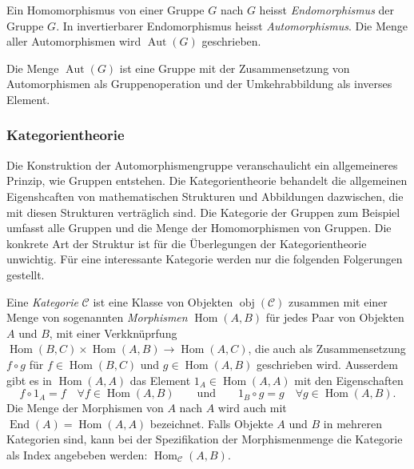\begin{definition}
Ein Homomorphismus von einer Gruppe $G$ nach $G$ heisst {\em Endomorphismus}
der Gruppe $G$.
In invertierbarer Endomorphismus heisst {\em Automorphismus}.
Die Menge aller Automorphismen wird 
$\operatorname{Aut}(G)$ geschrieben.
\end{definition}

\begin{satz}
Die Menge $\operatorname{Aut}(G)$ ist eine Gruppe mit der Zusammensetzung
von Automorphismen als Gruppenoperation und der Umkehrabbildung als
inverses Element.
\end{satz}

%
%
\subsubsection{Kategorientheorie}
Die Konstruktion der Automorphismengruppe veranschaulicht ein allgemeineres
Prinzip, wie Gruppen entstehen.
Die Kategorientheorie behandelt die allgemeinen Eigenshcaften von
mathematischen Strukturen und Abbildungen dazwischen, die mit diesen
Strukturen verträglich sind.
Die Kategorie der Gruppen zum Beispiel umfasst alle Gruppen und die
Menge der Homomorphismen von Gruppen.
Die konkrete Art der Struktur ist für die Überlegungen der Kategorientheorie
unwichtig.
Für eine interessante Kategorie werden nur die folgenden Folgerungen
gestellt.

\begin{definition}
Eine {\em Kategorie} $\mathscr{C}$ ist eine Klasse von Objekten
$\operatorname{obj}(\mathscr{C})$ zusammen mit einer
Menge von sogenannten {\em Morphismen} $\operatorname{Hom}(A,B)$ für
jedes Paar von Objekten $A$ und $B$, mit einer Verkknüprfung
$
\operatorname{Hom}(B,C)\times \operatorname{Hom}(A,B)
\to
\operatorname{Hom}(A,C)
$, die auch als Zusammensetzung $f\circ g$ für $f\in \operatorname{Hom}(B,C)$
und $g\in \operatorname{Hom}(A,B)$ geschrieben wird.
Ausserdem gibt es in $\operatorname{Hom}(A,A)$ das Element
$1_A\in\operatorname{Hom}(A,A)$ mit den Eigenschaften
\[
f\circ 1_A = f\quad\forall f\in \operatorname{Hom}(A,B)
\qquad\text{und}\qquad
1_B\circ g = g\quad\forall g\in\operatorname{Hom}(A,B).
\]
Die Menge der Morphismen von $A$ nach $A$ wird auch mit
$\operatorname{End}(A)=\operatorname{Hom}(A,A)$ bezeichnet.
Falls Objekte $A$ und $B$ in mehreren Kategorien sind, kann bei der
Spezifikation der Morphismenmenge die Kategorie als Index
angebeben werden: $\operatorname{Hom}_{\mathscr{C}}(A,B)$.
\end{definition}

